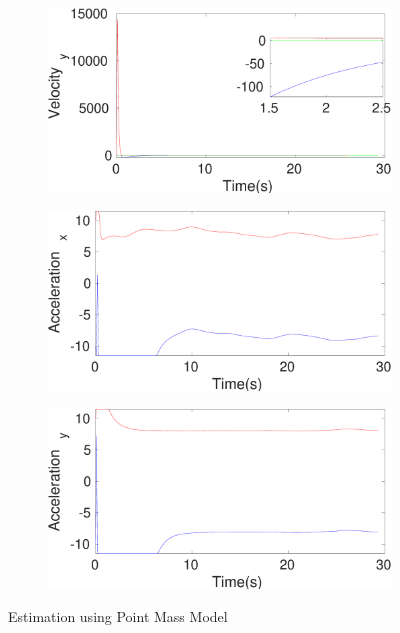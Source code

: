\begin{figure}[h]
\begin{subfigure}{.5\linewidth}
\end{subfigure}
\begin{subfigure}{.5\linewidth}
\centering
\includegraphics[width=\linewidth]{figures/HInf/s3pmHInfVelocity_y}
\end{subfigure}
\begin{subfigure}{.5\linewidth}
\centering
\includegraphics[width=\linewidth]{figures/HInf/s3pmHInfAcceleration_x}
\end{subfigure}
\begin{subfigure}{.5\linewidth}
\centering
\includegraphics[width=\linewidth]{figures/HInf/s3pmHInfAcceleration_y}
\end{subfigure}
\caption{Estimation using Point Mass Model}
\end{figure}

